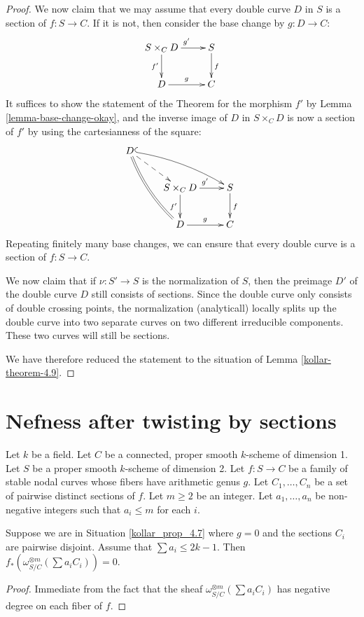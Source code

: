 \begin{proof}
We now claim that we may assume that every double curve $D$ in $S$ is a
section of $f : S \to C$.
If it is not, then consider the base change by $g : D \to C$:
$$
\xymatrix{
S \times_C D \ar[r]^{g'}\ar[d]_{f'} & S \ar[d]^f\\
D \ar[r]^g & C
}
$$
It suffices to show the statement of the Theorem for the morphism $f'$ by Lemma
\ref{lemma-base-change-okay}, and the inverse image of $D$ in $S \times_C D$ is
now a section of $f'$ by using the cartesianness of the square:
$$
\xymatrix{
D\ar@{=}@/_/[ddr]\ar@{^{(}->}@/^/[drr]\ar@{-->}[dr]\\
& S \times_C D \ar[r]^{g'}\ar[d]_{f'} & S \ar[d]^f\\
& D \ar[r]^g & C
}
$$
Repeating finitely many base changes, we can ensure that every double curve is a
section of $f : S \to C$.

We now claim that if $\nu : S' \to S$ is the normalization of $S$, then the
preimage $D'$ of the double curve $D$ still consists of sections.
Since the double curve only consists of double crossing points, the
normalization (analyticall) locally splits up the double curve into two separate
curves on two different irreducible components.
These two curves will still be sections.

We have therefore reduced the statement to the situation of Lemma
\ref{kollar-theorem-4.9}.
\end{proof}

\section{Nefness after twisting by sections}

\begin{situation}\label{kollar_prop_4.7}
Let $k$ be a field.
Let $C$ be a connected, proper smooth $k$-scheme of dimension 1.
Let $S$ be a proper smooth $k$-scheme of dimension 2.
Let $f:S\to C$ be a family of stable nodal curves whose fibers have arithmetic genus $g$.
Let $C_1,\ldots,C_n$ be a set of pairwise distinct sections of $f$.
Let $m\ge2$ be an integer.
Let $a_1,\ldots,a_n$ be non-negative integers such that $a_i\le m$ for each $i$.
\end{situation}

\begin{lemma}\label{base_case_genus_0}
Suppose we are in Situation \ref{kollar_prop_4.7} where $g=0$ and the sections $C_i$ are pairwise disjoint.
Assume that $\sum a_i\le 2k-1$.
Then $f_{*}(\omega_{S/C}^{\otimes m}(\sum a_iC_i))=0$.
\end{lemma}
\begin{proof}
Immediate from the fact that the sheaf $\omega_{S/C}^{\otimes m}(\sum a_iC_i)$ has negative degree on each fiber of $f$.
\end{proof}

